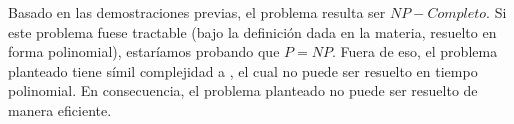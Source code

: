\documentclass[../tp3_grupo404.tex]{subfiles}
\begin{document}
Basado en las demostraciones previas, el problema resulta ser $NP-Completo$.
Si este problema fuese tractable (bajo la definición dada en la materia, resuelto en forma polinomial),
estaríamos probando que $P=NP$.
Fuera de eso, el problema planteado tiene símil complejidad a ,
el cual no puede ser resuelto en tiempo polinomial. En consecuencia, el problema planteado
no puede ser resuelto de manera eficiente.


\end{document}
